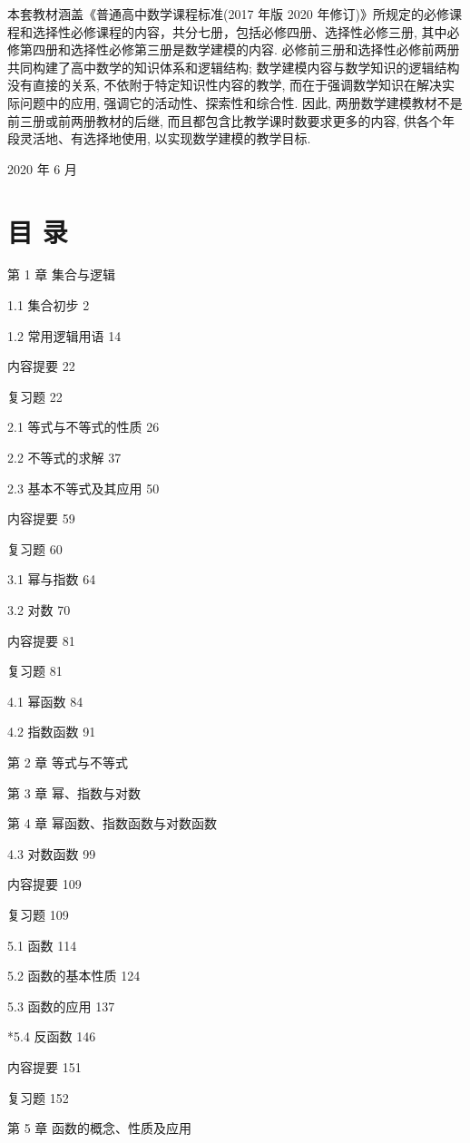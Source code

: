 \documentclass[10pt]{article}
\begin{document}
本套教材涵盖《普通高中数学课程标准(2017 年版 2020 年修订)》所规定的必修课程和选择性必修课程的内容，共分七册，包括必修四册、选择性必修三册, 其中必修第四册和选择性必修第三册是数学建模的内容. 必修前三册和选择性必修前两册共同构建了高中数学的知识体系和逻辑结构; 数学建模内容与数学知识的逻辑结构没有直接的关系, 不依附于特定知识性内容的教学, 而在于强调数学知识在解决实际问题中的应用, 强调它的活动性、探索性和综合性. 因此, 两册数学建模教材不是前三册或前两册教材的后继, 而且都包含比教学课时数要求更多的内容, 供各个年段灵活地、有选择地使用, 以实现数学建模的教学目标.

2020 年 6 月

\section*{目 录}

第 1 章 集合与逻辑

1.1 集合初步 2

1.2 常用逻辑用语 14

内容提要 22

复习题 22

2.1 等式与不等式的性质 26

2.2 不等式的求解 37

2.3 基本不等式及其应用 50

内容提要 59

复习题 60

3.1 幂与指数 64

3.2 对数 70

内容提要 81

复习题 81

4.1 幂函数 84

4.2 指数函数 91

第 2 章 等式与不等式

第 3 章 幂、指数与对数

第 4 章 幂函数、指数函数与对数函数





4.3 对数函数 99

内容提要 109

复习题 109

5.1 函数 114

5.2 函数的基本性质 124

5.3 函数的应用 137

*5.4 反函数 146

内容提要 151

复习题 152

第 5 章 函数的概念、性质及应用
\end{document}
